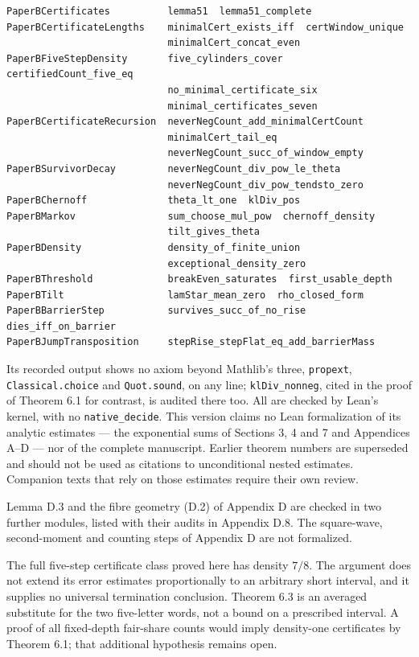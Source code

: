 \documentclass[11pt,a4paper]{article}
\begin{document}
\begin{verbatim}
PaperBCertificates          lemma51  lemma51_complete
PaperBCertificateLengths    minimalCert_exists_iff  certWindow_unique
                            minimalCert_concat_even
PaperBFiveStepDensity       five_cylinders_cover  certifiedCount_five_eq
                            no_minimal_certificate_six
                            minimal_certificates_seven
PaperBCertificateRecursion  neverNegCount_add_minimalCertCount
                            minimalCert_tail_eq
                            neverNegCount_succ_of_window_empty
PaperBSurvivorDecay         neverNegCount_div_pow_le_theta
                            neverNegCount_div_pow_tendsto_zero
PaperBChernoff              theta_lt_one  klDiv_pos
PaperBMarkov                sum_choose_mul_pow  chernoff_density
                            tilt_gives_theta
PaperBDensity               density_of_finite_union
                            exceptional_density_zero
PaperBThreshold             breakEven_saturates  first_usable_depth
PaperBTilt                  lamStar_mean_zero  rho_closed_form
PaperBBarrierStep           survives_succ_of_no_rise  dies_iff_on_barrier
PaperBJumpTransposition     stepRise_stepFlat_eq_add_barrierMass
\end{verbatim}

Its recorded output shows no axiom beyond Mathlib's three,
\texttt{propext}, \texttt{Classical.choice} and \texttt{Quot.sound}, on
any line; \texttt{klDiv\_nonneg}, cited in the proof of Theorem 6.1 for
contrast, is audited there too. All are checked by Lean's kernel, with
no \texttt{native\_decide}. This version claims no Lean formalization of
its analytic estimates --- the exponential sums of Sections 3, 4 and 7
and Appendices A--D --- nor of the complete manuscript. Earlier theorem
numbers are superseded and should not be used as citations to
unconditional nested estimates. Companion texts that rely on those
estimates require their own review.

Lemma D.3 and the fibre geometry (D.2) of Appendix D are checked in two
further modules, listed with their audits in Appendix D.8. The
square-wave, second-moment and counting steps of Appendix D are not
formalized.

The full five-step certificate class proved here has density \(7/8\).
The argument does not extend its error estimates proportionally to an
arbitrary short interval, and it supplies no universal termination
conclusion. Theorem 6.3 is an averaged substitute for the two
five-letter words, not a bound on a prescribed interval. A proof of all
fixed-depth fair-share counts would imply density-one certificates by
Theorem 6.1; that additional hypothesis remains open.
\end{document}
